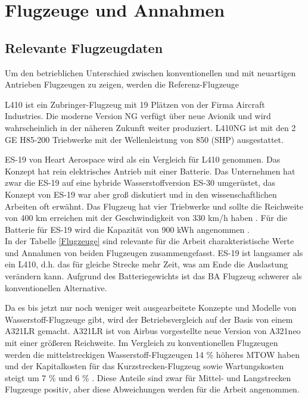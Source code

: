 
\section{Flugzeuge und Annahmen}
\subsection{Relevante Flugzeugdaten}
Um den betrieblichen Unterschied zwischen konventionellen und mit neuartigen Antrieben Flugzeugen zu zeigen, werden die Referenz-Flugzeuge

L410 ist ein Zubringer-Flugzeug mit 19 Plätzen von der Firma Aircraft Industries. Die moderne Version NG verfügt über neue Avionik und wird
wahrscheinlich in der näheren Zukunft weiter produziert.
L410NG ist mit den 2 GE H85-200 Triebwerke mit der Wellenleistung von 850 (SHP) ausgestattet.


ES-19 von Heart Aerospace wird als ein Vergleich für L410 genommen. Das Konzept hat rein elektrisches Antrieb mit einer Batterie.
Das Unternehmen hat zwar die ES-19 auf eine hybride Wasserstoffversion ES-30 umgerüstet, das Konzept von ES-19 war aber groß diskutiert 
und in den wissenschaftlichen Arbeiten oft erwähnt. Das Flugzeug hat vier Triebwerke und sollte die Reichweite von 400 km erreichen 
mit der Geschwindigkeit von 330 km/h haben \cite{anker2023feasibility} \cite{heart_aerospace_es19}.
Für die Batterie für ES-19 wird die Kapazität von 900 kWh angenommen \cite{donckers2024electric}. \\
In der Tabelle \ref{Flugzeuge} sind relevante für die Arbeit charakteristische Werte und Annahmen von beiden Flugzeugen zusammengefasst.
ES-19 ist langsamer als ein L410, d.h. das für gleiche Strecke mehr Zeit, was am Ende die Auslastung verändern kann.
Aufgrund des Batteriegewichts ist das BA Flugzeug schwerer als konventionellen Alternative.

Da es bis jetzt nur noch weniger weit ausgearbeitete Konzepte und Modelle von Wasserstoff-Flugzeuge gibt, wird der Betriebsvergleich
auf der Basis von einem A321LR gemacht.
A321LR ist von Airbus vorgestellte neue Version von A321neo mit einer größeren Reichweite.
Im Vergleich zu konventionellen Flugzeugen werden die mittelstreckigen Wasserstoff-Flugzeugen 14 \% höheres MTOW haben 
und der Kapitalkosten für das Kurzstrecken-Flugzeug sowie Wartungskosten steigt um 7 \% und 6 \% \cite{sky2020hydrogen}. 
Diese Anteile sind zwar für Mittel- und Langstrecken Flugzeuge positiv, aber diese Abweichungen werden für die Arbeit angenommen.

